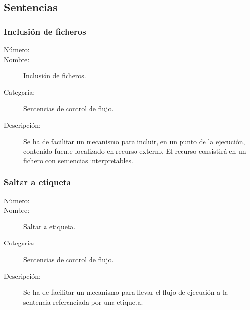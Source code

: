 \subsection{Sentencias}
\subsubsection{Inclusión de ficheros}
	\begin{description}
		\item [Número:] \cn
		\item [Nombre:] Inclusión de ficheros.
		\item [Categoría:] Sentencias de control de flujo.
		\item [Descripción:] Se ha de facilitar un mecanismo para incluir, en un punto de la ejecución, contenido fuente localizado en recurso
		externo. El recurso consistirá en un fichero con sentencias interpretables.
	\end {description}

\subsubsection{Saltar a etiqueta}
	\begin{description}
		\item [Número:] \cn
		\item [Nombre:] Saltar a etiqueta.
		\item [Categoría:] Sentencias de control de flujo.
		\item [Descripción:] Se ha de facilitar un mecanismo para llevar el flujo de ejecución a la sentencia  
		referenciada por una etiqueta.
	\end {description}


